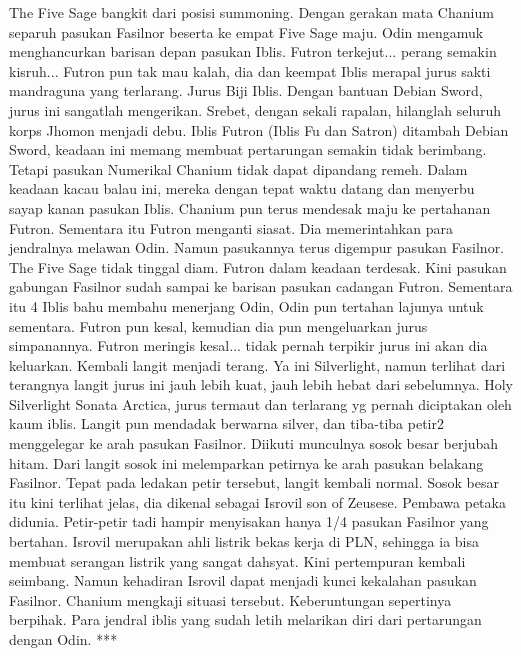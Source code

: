 \documentclass[a4paper,11pt,final]{article}
\begin{document}
The Five Sage bangkit dari posisi summoning. Dengan gerakan mata Chanium separuh pasukan Fasilnor beserta ke empat Five Sage maju. Odin mengamuk menghancurkan barisan depan pasukan Iblis. Futron terkejut... perang semakin kisruh...
Futron pun tak mau kalah, dia dan keempat Iblis merapal jurus sakti mandraguna yang terlarang. Jurus Biji Iblis. Dengan bantuan Debian Sword, jurus ini sangatlah mengerikan. Srebet, dengan sekali rapalan, hilanglah seluruh korps Jhomon menjadi debu.
Iblis Futron (Iblis Fu dan Satron) ditambah Debian Sword, keadaan ini memang membuat pertarungan semakin tidak berimbang.
Tetapi pasukan Numerikal Chanium tidak dapat dipandang remeh. Dalam keadaan kacau balau ini, mereka dengan tepat waktu datang dan menyerbu sayap kanan pasukan Iblis. Chanium pun terus mendesak maju ke pertahanan Futron.
Sementara itu Futron menganti siasat. Dia memerintahkan para jendralnya melawan Odin. Namun pasukannya terus digempur pasukan Fasilnor. The Five Sage tidak tinggal diam. Futron dalam keadaan terdesak.
Kini pasukan gabungan Fasilnor sudah sampai ke barisan pasukan cadangan Futron. Sementara itu 4 Iblis bahu membahu menerjang Odin, Odin pun tertahan lajunya untuk sementara. Futron pun kesal, kemudian dia pun mengeluarkan jurus simpanannya.
Futron meringis kesal... tidak pernah terpikir jurus ini akan dia keluarkan. Kembali langit menjadi terang. Ya ini Silverlight, namun terlihat dari terangnya langit jurus ini jauh lebih kuat, jauh lebih hebat dari sebelumnya.
Holy Silverlight Sonata Arctica, jurus termaut dan terlarang yg pernah diciptakan oleh kaum iblis. Langit pun mendadak berwarna silver, dan tiba-tiba petir2 menggelegar ke arah pasukan Fasilnor. Diikuti munculnya sosok besar berjubah hitam.
Dari langit sosok ini melemparkan petirnya ke arah pasukan belakang Fasilnor. Tepat pada ledakan petir tersebut, langit kembali normal. Sosok besar itu kini terlihat jelas, dia dikenal sebagai Isrovil son of Zeusese. Pembawa petaka didunia.
Petir-petir tadi hampir menyisakan hanya 1/4 pasukan Fasilnor yang bertahan. Isrovil merupakan ahli listrik bekas kerja di PLN, sehingga ia bisa membuat serangan listrik yang sangat dahsyat. Kini pertempuran kembali seimbang.
Namun kehadiran Isrovil dapat menjadi kunci kekalahan pasukan Fasilnor. Chanium mengkaji situasi tersebut. Keberuntungan sepertinya berpihak. Para jendral iblis yang sudah letih melarikan diri dari pertarungan dengan Odin.
***
\end{document}
